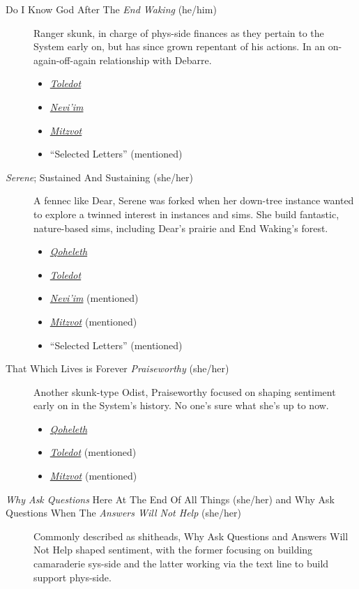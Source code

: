 \begin{description}
\item[Do I Know God After The \emph{End Waking} (he/him)]
Ranger skunk, in charge of phys-side finances as they pertain to the System early on, but has since grown repentant of his actions. In an on-again-off-again relationship with Debarre.


\begin{itemize}
\tightlist
\item
  \href{https://toledot.post-self.ink}{\emph{Toledot}}
\item
  \href{https://neviim.post-self.ink}{\emph{Nevi'im}}
\item
  \href{https://mitzvot.post-self.ink}{\emph{Mitzvot}}
\item
  ``Selected Letters'' (mentioned)
\end{itemize}
\item[\emph{Serene}; Sustained And Sustaining (she/her)]
A fennec like Dear, Serene was forked when her down-tree instance wanted to explore a twinned interest in instances and sims. She build fantastic, nature-based sims, including Dear's prairie and End Waking's forest.

\begin{itemize}
\tightlist
\item
  \href{https://qoheleth.post-self.ink}{\emph{Qoheleth}}
\item
  \href{https://toledot.post-self.ink}{\emph{Toledot}}
\item
  \href{https://neviim.post-self.ink}{\emph{Nevi'im}} (mentioned)
\item
  \href{https://mitzvot.post-self.ink}{\emph{Mitzvot}} (mentioned)
\item
  ``Selected Letters'' (mentioned)
\end{itemize}
\item[That Which Lives is Forever \emph{Praiseworthy} (she/her)]
Another skunk-type Odist, Praiseworthy focused on shaping sentiment early on in the System's history. No one's sure what she's up to now.

\begin{itemize}
\tightlist
\item
  \href{https://qoheleth.post-self.ink}{\emph{Qoheleth}}
\item
  \href{https://toledot.post-self.ink}{\emph{Toledot}} (mentioned)
\item
  \href{https://mitzvot.post-self.ink}{\emph{Mitzvot}} (mentioned)
\end{itemize}
\item[\emph{Why Ask Questions} Here At The End Of All Things (she/her) and Why Ask Questions When The \emph{Answers Will Not Help} (she/her)]
Commonly described as shitheads, Why Ask Questions and Answers Will Not Help shaped sentiment, with the former focusing on building camaraderie sys-side and the latter working via the text line to build support phys-side.


\end{description}

